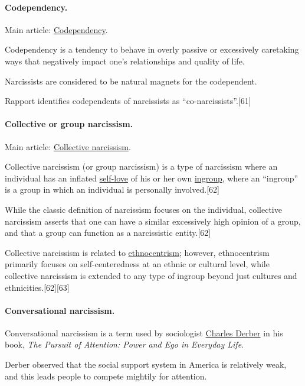 \documentclass[oneside]{book}
\numberwithin{equation}{section}
\begin{document}
\paragraph{Codependency.} Main article: \href{https://en.wikipedia.org/wiki/Codependency}{Codependency}.

Codependency is a tendency to behave in overly passive or excessively caretaking ways that negatively impact one's relationships and quality of life.

Narcissists are considered to be natural magnets for the codependent.

Rapport identifies codependents of narcissists as ``co-narcissists''.[61]

\paragraph{Collective or group narcissism.} Main article: \href{https://en.wikipedia.org/wiki/Collective_narcissism}{Collective narcissism}.

Collective narcissism (or group narcissism) is a type of narcissism where an individual has an inflated \href{https://en.wikipedia.org/wiki/Self-love}{self-love} of his or her own \href{https://en.wikipedia.org/wiki/Ingroup}{ingroup}, where an ``ingroup'' is a group in which an individual is personally involved.[62]

While the classic definition of narcissism focuses on the individual, collective narcissism asserts that one can have a similar excessively high opinion of a group, and that a group can function as a narcissistic entity.[62]

Collective narcissism is related to \href{https://en.wikipedia.org/wiki/Ethnocentrism}{ethnocentrism}; however, ethnocentrism primarily focuses on self-centeredness at an ethnic or cultural level, while collective narcissism is extended to any type of ingroup beyond just cultures and ethnicities.[62][63]

\paragraph{Conversational narcissism.} Conversational narcissism is a term used by sociologist \href{https://en.wikipedia.org/wiki/Charles_Derber}{Charles Derber} in his book, \textit{The Pursuit of Attention: Power and Ego in Everyday Life}.

Derber observed that the social support system in America is relatively weak, and this leads people to compete mightily for attention.
\end{document}
